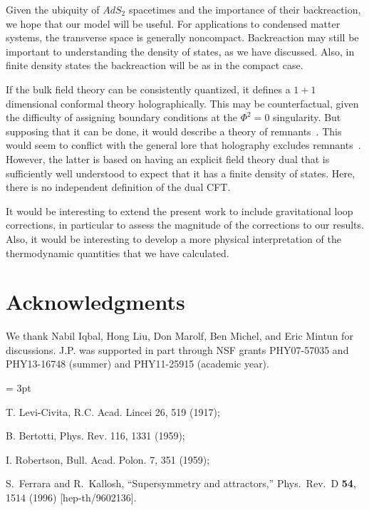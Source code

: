 \documentclass[12pt]{article}
\begin{document}
{Given the ubiquity of $AdS_2$ spacetimes and the importance of their backreaction, we hope that our model will be useful.
For applications to condensed matter systems, the transverse space is generally noncompact.  Backreaction may still be important to 
understanding the density of states, as we have discussed.  Also, in finite density states the backreaction will be as in the compact case.

If the bulk field theory can be consistently quantized, it defines a $1+1$ dimensional conformal theory holographically.  This may be counterfactual, given the difficulty of assigning boundary conditions at the $\Phi^2 = 0$ singularity.  But supposing that it can be done, it would describe a theory of remnants~\cite{Banks:1992ba,Giddings:1992ff,Almheiri:2013wka}.  This would seem to conflict with the general lore that holography excludes remnants~\cite{Almheiri:2013hfa}.  However, the latter is based on having an explicit field theory dual that is sufficiently well understood to expect that it has a finite density of states.  Here, there is no independent definition of the dual CFT.

It would be interesting to extend the present work to include gravitational loop corrections, in particular to assess the magnitude of the corrections to our results.  Also, it would be interesting to develop a more physical interpretation of the thermodynamic quantities that we have calculated.


\section*{Acknowledgments}

We thank Nabil Iqbal, Hong Liu, Don Marolf, Ben Michel, and Eric Mintun for discussions.  J.P. was supported in part through NSF grants PHY07-57035 and PHY13-16748 (summer) and PHY11-25915 (academic year).

\begin{thebibliography}{99}
\itemsep = 3pt

T. Levi-Civita, R.C. Acad. Lincei 26, 519 (1917); 

B. Bertotti, Phys. Rev. 116, 1331 (1959); 

I. Robertson, Bull. Acad. Polon. 7, 351 (1959);

S.~Ferrara and R.~Kallosh,
  ``Supersymmetry and attractors,''
  Phys.\ Rev.\ D {\bf 54}, 1514 (1996)
  [hep-th/9602136].


\end{thebibliography}}
\end{document}
